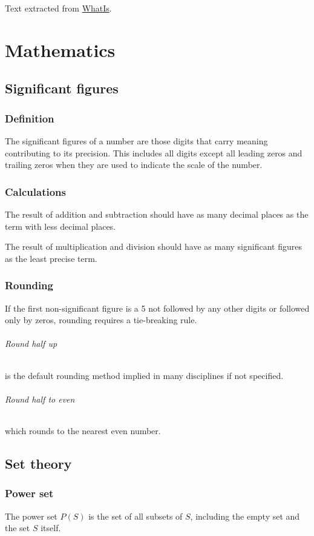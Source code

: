 \documentclass[12pt, oneside]{book}
\begin{document}
Text extracted from
\href{http://whatis.techtarget.com/definition/superposition}{WhatIs}.

\part{Mathematics}

\chapter{Significant figures}

\section{Definition}
The significant figures of a number are those digits that carry meaning
contributing to its precision. This includes all digits except all leading zeros
and trailing zeros when they are used to indicate the scale of the number.

\section{Calculations}
The result of addition and subtraction should have as many decimal places as the
term with less decimal places.

The result of multiplication and division should have as many significant
figures as the least precise term.

\section{Rounding}
If the first non-significant figure is a 5 not followed by any other digits or
followed only by zeros, rounding requires a tie-breaking rule.
\paragraph{Round half up} is the default rounding method implied in many
disciplines if not specified.
\paragraph{Round half to even} which rounds to the nearest even number.

\chapter{Set theory}

\section{Power set}
The power set \(P(S)\) is the set of all subsets of \(S\), including the empty
set and the set \(S\) itself.
\end{document}
